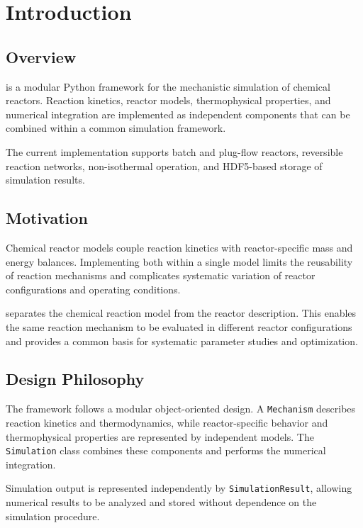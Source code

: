 \chapter{Introduction}

\section{Overview}

\VirtualReactor{} is a modular Python framework for the mechanistic simulation
of chemical reactors. Reaction kinetics, reactor models, thermophysical
properties, and numerical integration are implemented as independent
components that can be combined within a common simulation framework.

The current implementation supports batch and plug-flow reactors, reversible
reaction networks, non-isothermal operation, and HDF5-based storage of
simulation results.


\section{Motivation}

Chemical reactor models couple reaction kinetics with reactor-specific mass
and energy balances. Implementing both within a single model limits the
reusability of reaction mechanisms and complicates systematic variation of
reactor configurations and operating conditions.

\VirtualReactor{} separates the chemical reaction model from the reactor
description. This enables the same reaction mechanism to be evaluated in
different reactor configurations and provides a common basis for systematic
parameter studies and optimization.


\section{Design Philosophy}

The framework follows a modular object-oriented design. A
\texttt{Mechanism} describes reaction kinetics and thermodynamics, while
reactor-specific behavior and thermophysical properties are represented by
independent models. The \texttt{Simulation} class combines these components
and performs the numerical integration.

Simulation output is represented independently by
\texttt{SimulationResult}, allowing numerical results to be analyzed and
stored without dependence on the simulation procedure.


